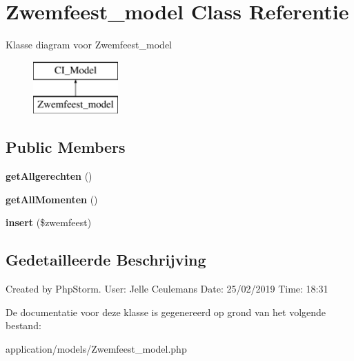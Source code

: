 \hypertarget{class_zwemfeest__model}{}\section{Zwemfeest\+\_\+model Class Referentie}
\label{class_zwemfeest__model}
Klasse diagram voor Zwemfeest\+\_\+model\begin{figure}[H]
\begin{center}
\leavevmode
\includegraphics[height=2.000000cm]{class_zwemfeest__model}
\end{center}
\end{figure}
\subsection*{Public Members}
\begin{DoxyCompactItemize}
\item 
\mbox{\label{class_zwemfeest__model_a25246d2c74468cdf44a5dadc6ee05a35}} 
{\bfseries get\+Allgerechten} ()
\item 
\mbox{\label{class_zwemfeest__model_ad31458620e1be7dd5a220b868add44cb}} 
{\bfseries get\+All\+Momenten} ()
\item 
\mbox{\label{class_zwemfeest__model_a5629bb12ac586551d6663b97423d065c}} 
{\bfseries insert} (\$zwemfeest)
\end{DoxyCompactItemize}


\subsection{Gedetailleerde Beschrijving}
Created by Php\+Storm. User\+: Jelle Ceulemans Date\+: 25/02/2019 Time\+: 18\+:31 

De documentatie voor deze klasse is gegenereerd op grond van het volgende bestand\+:\begin{DoxyCompactItemize}
\item 
application/models/Zwemfeest\+\_\+model.\+php\end{DoxyCompactItemize}
